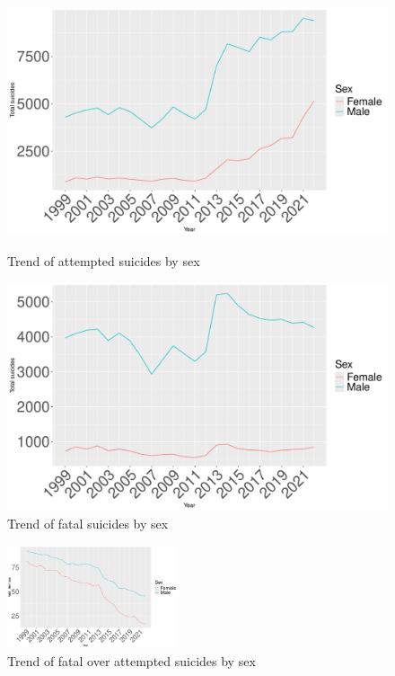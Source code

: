 \documentclass{article}
\begin{document}
\begin{figure}[H]
    \centering
    \begin{minipage}{0.45\textwidth}
        \includegraphics[width=\textwidth]{imgs/sex_attempted.pdf}
        \caption{Trend of attempted suicides by sex }
	\label{fig:sex_attempted}
    \end{minipage}
    \hfill
    \begin{minipage}{0.45\textwidth}
        \includegraphics[width=\textwidth]{imgs/sex_fatal.pdf}
        \caption{Trend of fatal suicides by sex }
	\label{fig:sex_fatal}
    \end{minipage}
\end{figure}

\begin{figure}[H]
    \centering
    \includegraphics[width=0.45\textwidth]{imgs/sex_foa.pdf}
    \caption{Trend of fatal over attempted suicides by sex }
    \label{fig:sex_foa}
\end{figure}
\end{document}
